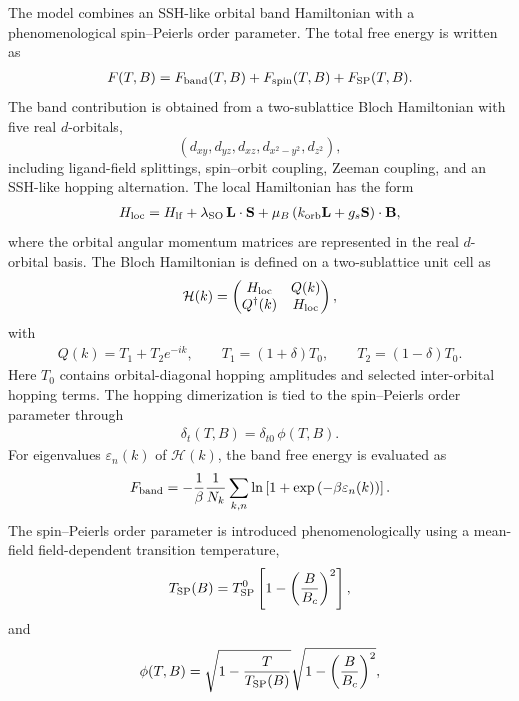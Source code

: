 The model combines an SSH-like orbital band Hamiltonian with a
phenomenological spin--Peierls order parameter. The total free energy
is written as
\begin{align}
F(T,B)
=
F_{\rm band}(T,B)
+
F_{\rm spin}(T,B)
+
F_{\rm SP}(T,B).
\end{align}
The band contribution is obtained from a two-sublattice Bloch
Hamiltonian with five real \(d\)-orbitals,
\[
(d_{xy},d_{yz},d_{xz},d_{x^2-y^2},d_{z^2}),
\]
including ligand-field splittings, spin--orbit coupling, Zeeman
coupling, and an SSH-like hopping alternation. The local Hamiltonian
has the form
\begin{align}
H_{\rm loc}
=
H_{\rm lf}
+
\lambda_{\rm SO}\,\mathbf L\cdot\mathbf S
+
\mu_B
\left(
k_{\rm orb}\mathbf L
+
g_s\mathbf S
\right)\cdot\mathbf B,
\end{align}
where the orbital angular momentum matrices are represented in the
real \(d\)-orbital basis.
The Bloch Hamiltonian is defined on a two-sublattice unit cell as
\begin{align}
\mathcal H(k)
=
\begin{pmatrix}
H_{\rm loc} & Q(k)\\
Q^\dagger(k) & H_{\rm loc}
\end{pmatrix},
\end{align}
with
\begin{align}
Q(k)
=
T_1+T_2 e^{-ik},
\qquad
T_1=(1+\delta)T_0,
\qquad
T_2=(1-\delta)T_0.
\end{align}
Here \(T_0\) contains orbital-diagonal hopping amplitudes and selected
inter-orbital hopping terms. The hopping dimerization is tied to the
spin--Peierls order parameter through
\begin{align}
\delta_t(T,B)
=
\delta_{t0}\,\phi(T,B).
\end{align}
For eigenvalues \(\varepsilon_n(k)\) of \(\mathcal H(k)\), the band
free energy is evaluated as
\begin{align}
F_{\rm band}
=
-\frac{1}{\beta}
\frac{1}{N_k}
\sum_{k,n}
\ln
\left[
1+
\exp\left(-\beta \varepsilon_n(k)\right)
\right].
\end{align}
The spin--Peierls order parameter is introduced phenomenologically
using a mean-field field-dependent transition temperature,
\begin{align}
T_{\rm SP}(B)
=
T_{\rm SP}^{0}
\left[
1-\left(\frac{B}{B_c}\right)^2
\right],
\end{align}
and
\begin{align}
\phi(T,B)
=
\sqrt{1-\frac{T}{T_{\rm SP}(B)}}
\sqrt{1-\left(\frac{B}{B_c}\right)^2},
\end{align}
